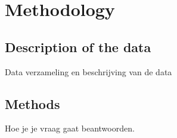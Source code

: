 \section{Methodology}
\label{sec:meth}


\subsection{Description of the data}
Data verzameling en beschrijving van de data









% 



\subsection{Methods}
Hoe je je vraag gaat beantwoorden.


